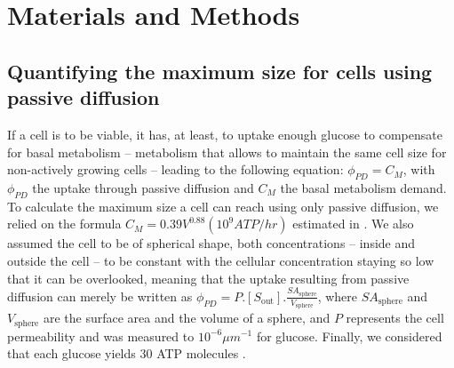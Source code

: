 \documentclass[nogrid,crop,final]{MBE2}%
\begin{document}

\section{Materials and Methods\label{sec:M&M}}





\subsection{Quantifying the maximum size for cells using passive diffusion}

If a cell is to be viable, it has, at least, to uptake enough glucose to compensate for basal metabolism -- metabolism that allows to maintain the same cell size for non-actively growing cells \citep{Lynch15} -- leading to the following equation: $\phi_{PD}=C_M$, with $\phi_{PD}$ the uptake through passive diffusion and $C_M$ the basal metabolism demand. To calculate the maximum size a cell can reach using only passive diffusion, we relied on the formula $C_M=0.39V^{0.88} (10^9 ATP/hr)$ estimated in \citep{Lynch15}. We also assumed the cell to be of spherical shape, both concentrations -- inside and outside the cell -- to be constant with the cellular concentration staying so low that it can be overlooked, meaning that the uptake resulting from passive diffusion can merely be written as $\phi_{PD}=P.[S_{\text{out}}].\frac{SA_{\text{sphere}}}{V_{\text{sphere}}}$, where $SA_{\text{sphere}}$ and $V_{\text{sphere}}$ are the surface area and the volume of a sphere, and $P$ represents the cell permeability and was measured to $10^{-6}\mu m^{-1}$ \citep{Wood68} for glucose. Finally, we considered that each glucose yields 30 ATP molecules \citep{Rich03}. 
\end{document}
